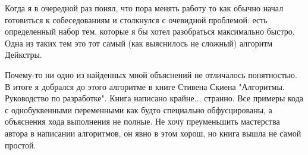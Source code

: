\documentclass[../article.tex]{subfiles}
\begin{document}

Когда я в очередной раз понял, что пора менять работу то как обычно начал готовиться к собеседованиям и столкнулся с очевидной проблемой: есть определенный набор тем, которые я бы хотел разобраться максимально быстро. Одна из таких тем это тот самый (как выяснилось не сложный) алгоритм Дейкстры.

Почему-то ни одно из найденных мной объяснений не отличалось понятностью. В итоге я добрался до этого алгоритме в книге Стивена Скиена "Алгоритмы. Руководство по разработке". Книга написано крайне... странно. Все примеры кода с однобуквенными переменными как будто специально обфусцированы, а объяснения хода выполнения не полные. Не хочу преуменьшить мастерства автора в написании алгоритмов, он явно в этом хорош, но книга вышла не самой простой.
\end{document}
